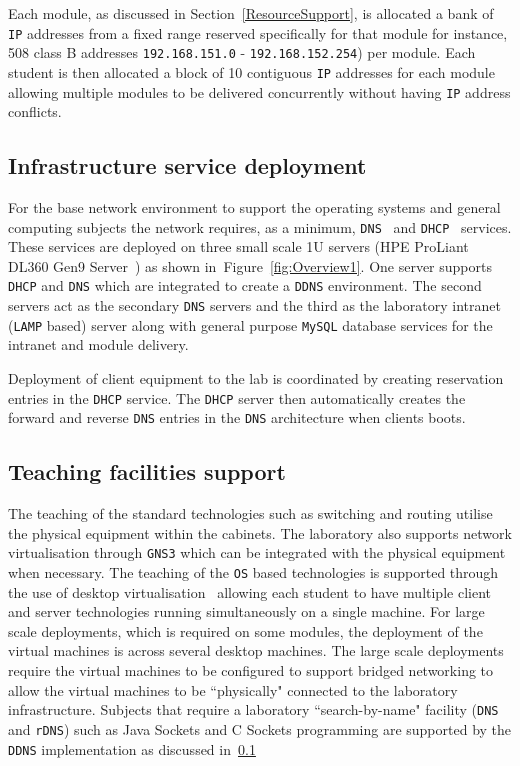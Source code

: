 Each module, as discussed in Section~\ref{ResourceSupport}, is allocated a bank of \texttt{IP} addresses from a fixed range reserved specifically for that module for instance, 508 class B addresses \texttt{192.168.151.0} - \texttt{192.168.152.254}) per module. Each student is then allocated a block of 10 contiguous \texttt{IP} addresses for each module allowing multiple modules to be delivered concurrently without having \texttt{IP} address conflicts. 

\subsection{Infrastructure service deployment}\label{InfraService}
For the base network environment to support the operating systems and general computing subjects the network requires, as a minimum, \texttt{DNS}~\cite{RA:11} and \texttt{DHCP}~\cite{DL:02} services. These services are deployed on three small scale 1U servers (HPE ProLiant DL360 Gen9 Server~\cite{HPE:17}) as shown in~Figure~\ref{fig:Overview1}. One server supports \texttt{DHCP} and \texttt{DNS} which are integrated to create a \texttt{DDNS} environment. The second servers act as the secondary \texttt{DNS} servers and the third as the laboratory intranet (\texttt{LAMP} based) server along with general purpose \texttt{MySQL} database services for the intranet and module delivery. 

Deployment of client equipment to the lab is coordinated by creating reservation entries in the \texttt{DHCP} service. The \texttt{DHCP} server then automatically creates the forward and reverse \texttt{DNS} entries in the \texttt{DNS} architecture when clients boots.

\subsection{Teaching facilities support}
The teaching of the standard technologies such as switching and routing utilise the physical equipment within the cabinets. The laboratory also supports network virtualisation through \texttt{GNS3} which can be integrated with the physical equipment when necessary. The teaching of the \texttt{OS} based technologies is supported through the use of desktop virtualisation~\cite{O:17,VMWARE:17} allowing each student to have multiple client and server technologies running simultaneously on a single machine. For large scale deployments, which is required on some modules, the deployment of the virtual machines is across several desktop machines. The large scale deployments require the virtual machines to be configured to support bridged networking to allow the virtual machines to be ``physically" connected to the laboratory infrastructure. Subjects that require a laboratory ``search-by-name" facility (\texttt{DNS} and \texttt{rDNS}) such as Java Sockets and C Sockets programming are supported by the \texttt{DDNS} implementation as discussed in~\ref{InfraService}

